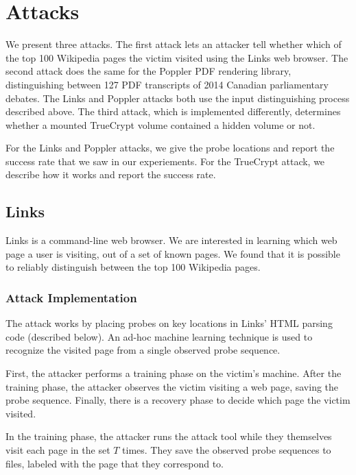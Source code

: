 \documentclass[letterpaper,twocolumn,10pt]{article}
\begin{document}
\section{Attacks}
\label{sec:results}

We present three attacks. The first attack lets an attacker tell whether which
of the top 100 Wikipedia pages the victim visited using the Links web browser.
The second attack does the same for the Poppler PDF rendering library,
distinguishing between 127 PDF transcripts of 2014 Canadian parliamentary
debates. The Links and Poppler attacks both use the input distinguishing process
described above. The third attack, which is implemented differently, determines
whether a mounted TrueCrypt volume contained a hidden volume or not.

For the Links and Poppler attacks, we give the probe locations and report the
success rate that we saw in our experiements. For the TrueCrypt attack, we
describe how it works and report the success rate.

\subsection{Links}

Links is a command-line web browser. We are interested in learning which web
page a user is visiting, out of a set of known pages. We found that it is
possible to reliably distinguish between the top 100 Wikipedia pages.



\subsubsection{Attack Implementation}

The attack works by placing probes on key locations in Links' HTML parsing code
(described below). An ad-hoc machine learning technique is used to recognize the
visited page from a single observed probe sequence.

First, the attacker performs a training phase on the victim's
machine.
After the training phase, the attacker observes the victim visiting a web page,
saving the probe sequence. Finally, there is a recovery phase to decide which
page the victim visited.

In the training phase, the attacker runs the attack tool while they themselves
visit each page in the set $T$ times. They save the observed probe sequences to
files, labeled with the page that they correspond to.
\end{document}
